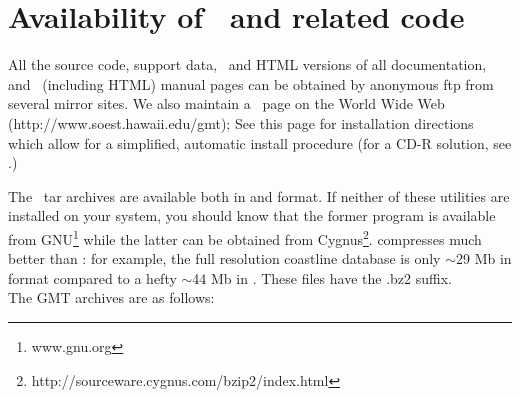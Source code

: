%
%
\chapter{Availability of \gmt\ and related code}
\thispagestyle{headings}

All the source code, support data, \PS\,
and HTML versions of all documentation, and \UNIX\
(including HTML) manual pages can be obtained by anonymous
ftp from several mirror sites.  We also maintain a \GMT\
page on the World Wide Web (http://www.soest.hawaii.edu/gmt);
See this page for installation directions 
which allow for a simplified, automatic install procedure
(for a CD-R solution, see .)

The \GMT\ tar archives are available both in \progname{gzip}
and  format.  If neither of these utilities
are installed on your system, you should know that the former
program is available from GNU\footnote{www.gnu.org} while the
latter can be obtained from Cygnus\footnote{http://sourceware.cygnus.com/bzip2/index.html}.
 compresses much better than :
for example, the full resolution coastline database is only
$\sim$29 Mb in \progname{bzip2} format compared to a hefty
$\sim$44 Mb in \progname{gzip}.  These files have the
.bz2 suffix. \\

The GMT archives are as follows:

